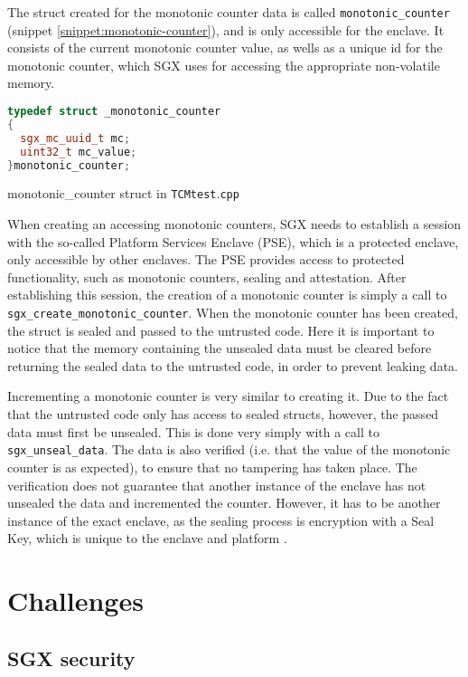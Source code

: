 \documentclass[12pt]{article}
\begin{document}
	The struct created for the monotonic counter data is called \texttt{monotonic\_counter} (snippet \ref{snippet:monotonic-counter}), and is only accessible for the enclave. It consists of the current monotonic counter value, as wells as a unique id for the monotonic counter, which SGX uses for accessing the appropriate non-volatile memory.
	\begin{snippet}[!ht]
		\begin{lstlisting}[language=C++]
typedef struct _monotonic_counter
{
  sgx_mc_uuid_t mc;
  uint32_t mc_value;
}monotonic_counter;
		\end{lstlisting}
		\caption{monotonic\_counter struct in \texttt{TCMtest$.$cpp} \label{snippet:monotonic-counter}}
	\end{snippet}

	When creating an accessing monotonic counters, SGX needs to establish a session with the so-called Platform Services Enclave (PSE), which is a protected enclave, only accessible by other enclaves. The PSE provides access to protected functionality, such as monotonic counters, sealing and attestation.
	After establishing this session, the creation of a monotonic counter is simply a call to \texttt{sgx\_create\_monotonic\_counter}.
	When the monotonic counter has been created, the struct is sealed and passed to the untrusted code. Here it is important to notice that the memory containing the unsealed data must be cleared before returning the sealed data to the untrusted code, in order to prevent leaking data.

	Incrementing a monotonic counter is very similar to creating it. Due to the fact that the untrusted code only has access to sealed structs, however, the passed data must first be unsealed. This is done very simply with a call to \texttt{sgx\_unseal\_data}. The data is also verified (i.e. that the value of the monotonic counter is as expected), to ensure that no tampering has taken place. The verification does not guarantee that another instance of the enclave has not unsealed the data and incremented the counter. However, it has to be another instance of the exact enclave, as the sealing process is encryption with a Seal Key, which is unique to the enclave and platform \cite{sgx-dev-guide}.


	\section{Challenges}

		\subsection{SGX security}
\end{document}
